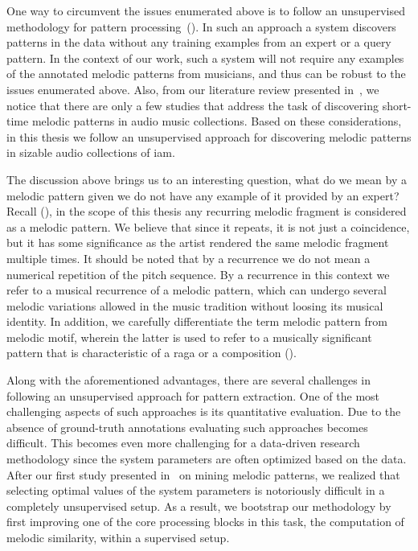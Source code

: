 One way to circumvent the issues enumerated above is to follow an unsupervised methodology for pattern processing~(). In such an approach a system discovers patterns in the data without any training examples from an expert or a query pattern. In the context of our work, such a system will not require any examples of the annotated melodic patterns from musicians, and thus can be robust to the issues enumerated above. Also, from our literature review presented in~, we notice that there are only a few studies that address the task of discovering short-time melodic patterns in audio music collections. Based on these considerations, in this thesis we follow an unsupervised approach for discovering melodic patterns in sizable audio collections of \gls{iam}. 

The discussion above brings us to an interesting question, what do we mean by a melodic pattern given we do not have any example of it provided by an expert? Recall (), in the scope of this thesis any recurring melodic fragment is considered as a melodic pattern. We believe that since it repeats, it is not just a coincidence, but it has some significance as the artist rendered the same melodic fragment multiple times. It should be noted that by a recurrence we do not mean a numerical repetition of the pitch sequence. By a recurrence in this context we refer to a musical recurrence of a melodic pattern, which can undergo several melodic variations allowed in the music tradition without loosing its musical identity. In addition, we carefully differentiate the term melodic pattern from melodic motif, wherein the latter is used to refer to a musically significant pattern that is characteristic of a \gls{raga} or a composition (). 

Along with the aforementioned advantages, there are several challenges in following an unsupervised approach for pattern extraction. One of the most challenging aspects of such approaches is its quantitative evaluation. Due to the absence of ground-truth annotations evaluating such approaches becomes difficult. This becomes even more challenging for a data-driven research methodology since the system parameters are often optimized based on the data. After our first study presented in~\cite{gulati_SITIS_2014} on mining melodic patterns, we realized that selecting optimal values of the system parameters is notoriously difficult in a completely unsupervised setup. As a result, we bootstrap our methodology by first improving one of the core processing blocks in this task, the computation of melodic similarity, within a supervised setup. 

